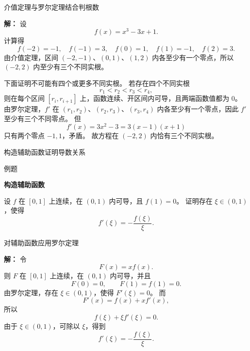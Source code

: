 \documentclass[aspectratio=169,10pt,fontset=fandol]{ctexbeamer}
\begin{document}
\begin{frame}[t,fragile]{介值定理与罗尔定理结合判根数}
\footnotesize
{\footnotesize
\textbf{解：}
设
\[
f(x)=x^3-3x+1.
\]
计算得
\[
f(-2)=-1,\quad f(-1)=3,\quad f(0)=1,\quad f(1)=-1,\quad f(2)=3.
\]
由介值定理，区间 $(-2,-1)$、$(0,1)$、$(1,2)$ 内各至少有一个零点，所以 $(-2,2)$ 内至少有三个不同实根。

下面证明不可能有四个或更多不同实根。 若存在四个不同实根
\[
r_1<r_2<r_3<r_4,
\]
则在每个区间 $[r_i,r_{i+1}]$ 上，函数连续、开区间内可导，且两端函数值都为 $0$。 由罗尔定理，$f'$ 在 $(r_1,r_2)$、$(r_2,r_3)$、$(r_3,r_4)$ 内各至少有一个零点，因此 $f'$ 至少有三个不同零点。 但
\[
f'(x)=3x^2-3=3(x-1)(x+1)
\]
只有两个零点 $-1,1$，矛盾。 故方程在 $(-2,2)$ 内恰有三个不同实根。

}
\end{frame}
\begin{frame}[t,fragile]{构造辅助函数证明导数关系}
\footnotesize
\begin{block}{例题}
{\footnotesize
\textbf{构造辅助函数}\par

设 $f$ 在 $[0,1]$ 上连续，在 $(0,1)$ 内可导，且 $f(1)=0$。 证明存在 $\xi\in(0,1)$，使得
\[
f'(\xi)=-\frac{f(\xi)}{\xi}.
\]

}
\end{block}
\end{frame}
\begin{frame}[t,fragile]{对辅助函数应用罗尔定理}
\footnotesize
{\footnotesize
\textbf{解：}
令
\[
F(x)=xf(x).
\]
则 $F$ 在 $[0,1]$ 上连续，在 $(0,1)$ 内可导，并且
\[
F(0)=0,\qquad F(1)=f(1)=0.
\]
由罗尔定理，存在 $\xi\in(0,1)$，使得 $F'(\xi)=0$。 而
\[
F'(x)=f(x)+xf'(x),
\]
所以
\[
f(\xi)+\xi f'(\xi)=0.
\]
由于 $\xi\in(0,1)$，可除以 $\xi$，得到
\[
f'(\xi)=-\frac{f(\xi)}{\xi}.
\]

}
\end{frame}
\end{document}
